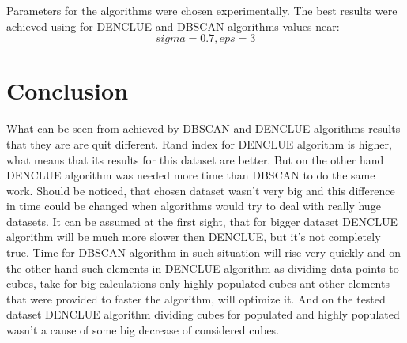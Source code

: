 \documentclass[12pt, a4paper, notitlepage, oneside]{article}
\begin{document}
Parameters for the algorithms were chosen experimentally. The best results were achieved using for DENCLUE and DBSCAN algorithms values near: 
$$sigma = 0.7, eps = 3$$



\cleardoublepage


\section*{Conclusion}

What can be seen from achieved by DBSCAN and DENCLUE algorithms results that they are are quit different. Rand index for DENCLUE algorithm is higher, what means that its results for this dataset are better. But on the other hand DENCLUE  algorithm was needed  more time than DBSCAN to do the same work.  Should be noticed, that chosen dataset wasn't very big and this difference in time could be changed when algorithms would try to deal with really huge datasets. It can be assumed at the first sight, that for bigger dataset DENCLUE algorithm will be much more slower then DENCLUE, but it's not completely true. Time for DBSCAN algorithm in such situation will rise very quickly and on the other hand such elements in DENCLUE algorithm as dividing data points to cubes, take for big calculations only highly populated cubes ant other elements that were provided to faster the algorithm, will optimize it. And on the tested dataset DENCLUE algorithm dividing cubes for populated and highly populated wasn't a cause of some big decrease of considered cubes. 




\newpage



\end{document}
